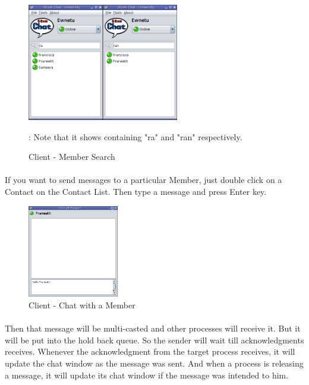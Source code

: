 \documentclass[a4paper,english,twoside]{article}
\begin{document}
\begin{figure}[h]
\begin{center}
\includegraphics[width=250px]{Client-Search.png}
\caption{Client - Member Search}
\figurename{: Note that it shows containing "ra" and "ran" respectively.}
\end{center}
\end{figure}
\paragraph{}
If you want to send messages to a particular Member, just double click on a Contact on the Contact List. Then type a message and press Enter key.

\begin{figure}[h]
\begin{center}
\includegraphics[width=150px]{Client-Chat-1.png}
\caption{Client - Chat with a Member}
\end{center}
\end{figure}
\paragraph{}
Then that message will be multi-casted and other processes will receive it. But it will be put into the hold back queue. So the sender will wait till acknowledgments receives. Whenever the acknowledgment from the target process receives, it will update the chat window as the message was sent. And when a process is releasing a message, it will update its chat window if the message was intended to him.
\end{document}
